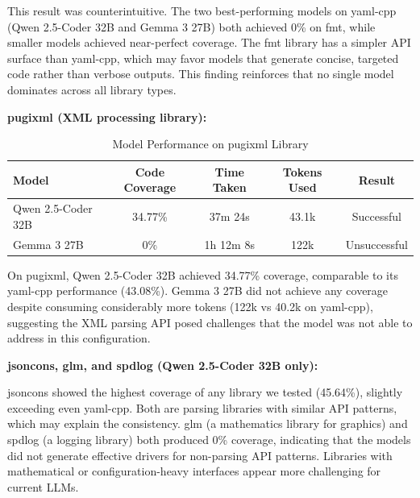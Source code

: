 This result was counterintuitive. The two best-performing models on yaml-cpp (Qwen 2.5-Coder 32B and Gemma 3 27B) both achieved 0\% on fmt, while smaller models achieved near-perfect coverage. The fmt library has a simpler API surface than yaml-cpp, which may favor models that generate concise, targeted code rather than verbose outputs. This finding reinforces that no single model dominates across all library types.

\textbf{pugixml (XML processing library):}

\begin{table}[htbp]
\centering
\caption{Model Performance on pugixml Library}
\label{tab:pugixml_results}
\small
\begin{tabular}{lcccc}
\toprule
Model & Code Coverage & Time Taken & Tokens Used & Result \\
\midrule
Qwen 2.5-Coder 32B & 34.77\% & 37m 24s & 43.1k & Successful \\
Gemma 3 27B & 0\% & 1h 12m 8s & 122k & Unsuccessful \\
\bottomrule
\end{tabular}
\end{table}

On pugixml, Qwen 2.5-Coder 32B achieved 34.77\% coverage, comparable to its yaml-cpp performance (43.08\%). Gemma 3 27B did not achieve any coverage despite consuming considerably more tokens (122k vs 40.2k on yaml-cpp), suggesting the XML parsing API posed challenges that the model was not able to address in this configuration.

\textbf{jsoncons, glm, and spdlog (Qwen 2.5-Coder 32B only):}

\begin{table}[htbp]
\centering
\caption{Qwen 2.5-Coder 32B Performance Across Additional Libraries}
\label{tab:additional_libraries}
\end{table}

jsoncons showed the highest coverage of any library we tested (45.64\%), slightly exceeding even yaml-cpp. Both are parsing libraries with similar API patterns, which may explain the consistency. glm (a mathematics library for graphics) and spdlog (a logging library) both produced 0\% coverage, indicating that the models did not generate effective drivers for non-parsing API patterns. Libraries with mathematical or configuration-heavy interfaces appear more challenging for current LLMs.

